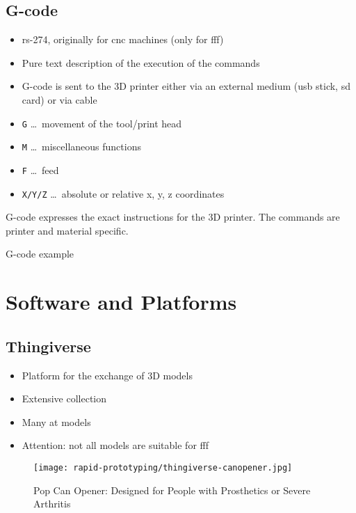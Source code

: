 \documentclass[aspectratio=169]{beamer}
\begin{document}
\subsection{G-code}
\begin{frame}
    \begin{itemize}
        \item \acs{rs}-274, originally for \acs{cnc} machines (only for \acs{fff})
        \item Pure text description of the execution of the commands
        \item G-code is sent to the 3D printer either via an external medium (\acs{usb} stick, \acs{sd} card) or via cable
        \item \texttt{G} \ldots\, movement of the tool/print head
        \item \texttt{M} \ldots\, miscellaneous functions
        \item \texttt{F} \ldots\, feed
        \item \texttt{X/Y/Z} \ldots\, absolute or relative x, y, z coordinates
    \end{itemize}
    \begin{exampleblock}{}
        G-code expresses the exact instructions for the 3D printer.
        The commands are printer and material specific.
    \end{exampleblock}
\end{frame}

\begin{frame}
    \begin{listing}[H]
        \caption{G-code example}
        \label{lst:gcode:example}
    \end{listing}
\end{frame}

\section{Software and Platforms}

\subsection{Thingiverse}
\begin{frame}
    \begin{itemize}
        \item Platform for the exchange of 3D models
        \item Extensive collection
        \item Many \acs{at} models
        \item Attention: not all models are suitable for \acs{fff}
    \end{itemize}
    \begin{figure}
        \texttt{[image: rapid-prototyping/thingiverse-canopener.jpg]}
        \caption{Pop Can Opener: Designed for People with Prosthetics or Severe Arthritis}
    \end{figure}
\end{frame}
\end{document}
